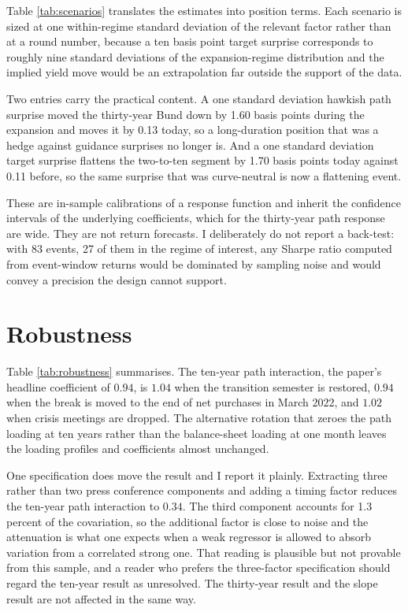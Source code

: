 \documentclass[11pt]{article}
\begin{document}
Table \ref{tab:scenarios} translates the estimates into position terms. Each
scenario is sized at one within-regime standard deviation of the relevant factor
rather than at a round number, because a ten basis point target surprise
corresponds to roughly nine standard deviations of the expansion-regime
distribution and the implied yield move would be an extrapolation far outside the
support of the data.

Two entries carry the practical content. A one standard deviation hawkish path
surprise moved the thirty-year Bund down by 1.60 basis points during the
expansion and moves it by 0.13 today, so a long-duration position that was a
hedge against guidance surprises no longer is. And a one standard deviation
target surprise flattens the two-to-ten segment by 1.70 basis points today
against 0.11 before, so the same surprise that was curve-neutral is now a
flattening event.

These are in-sample calibrations of a response function and inherit the
confidence intervals of the underlying coefficients, which for the thirty-year
path response are wide. They are not return forecasts. I deliberately do not
report a back-test: with 83 events, 27 of them in the regime of interest, any
Sharpe ratio computed from event-window returns would be dominated by sampling
noise and would convey a precision the design cannot support.

\section{Robustness}
\label{sec:robustness}

Table \ref{tab:robustness} summarises. The ten-year path interaction, the
paper's headline coefficient of $0.94$, is $1.04$ when the transition semester is
restored, $0.94$ when the break is moved to the end of net purchases in March
2022, and $1.02$ when crisis meetings are dropped. The alternative rotation that
zeroes the path loading at ten years rather than the balance-sheet loading at one
month leaves the loading profiles and coefficients almost unchanged.

One specification does move the result and I report it plainly. Extracting three
rather than two press conference components and adding a timing factor reduces
the ten-year path interaction to $0.34$. The third component accounts for 1.3
percent of the covariation, so the additional factor is close to noise and the
attenuation is what one expects when a weak regressor is allowed to absorb
variation from a correlated strong one. That reading is plausible but not
provable from this sample, and a reader who prefers the three-factor
specification should regard the ten-year result as unresolved. The thirty-year
result and the slope result are not affected in the same way.
\end{document}
